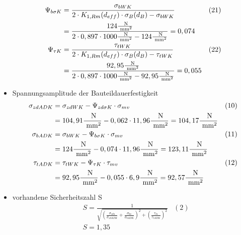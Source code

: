 \begin{itemize}
\begin{align*}
	\Psi_{b \sigma K}&= \frac{\sigma_{bWK}}{2 \cdot  K_{1,Rm} (d_{eff}) \cdot \sigma_B (d_B) -\sigma_{bWK}} &(21) \\
	&=  \frac{124 \frac{\text{ N}}{\text{ mm}^2}}{2 \cdot 0,897 \cdot 1000\frac{\text{ N}}{\text{ mm}^2} - 124 \frac{\text{ N}}{\text{ mm}^2}} = 0,074 \\
	\Psi_{\tau K}&= \frac{\tau_{tWK}}{2 \cdot  K_{1,Rm} (d_{eff}) \cdot \sigma_B (d_B) -\tau_{tWK}} &(22) \\
	&=  \frac{92,95 \frac{\text{ N}}{\text{ mm}^2}}{2 \cdot 0,897 \cdot 1000\frac{\text{ N}}{\text{ mm}^2} - 92,95 \frac{\text{ N}}{\text{ mm}^2}} = 0,055 
	\end{align*}
	\item Spannungsamplitude der Bauteildauerfestigkeit
	\begin{align*}
	\sigma_{zdADK} &= \sigma_{zdWK} - \Psi_{zd \sigma K} \cdot \sigma_{mv} &(10) \\
	&= 104,91\frac{\text{ N}}{\text{ mm}^2} - 0,062 \cdot 11,96 \frac{\text{ N}}{\text{ mm}^2} = 104,17 \frac{\text{ N}}{\text{ mm}^2} \\
	\sigma_{bADK} &= \sigma_{bWK} - \Psi_{b \sigma K} \cdot \sigma_{mv} &(11) \\
	&= 124\frac{\text{ N}}{\text{ mm}^2} - 0,074 \cdot 11,96 \frac{\text{ N}}{\text{ mm}^2} = 123,11\frac{\text{ N}}{\text{ mm}^2} \\
	\tau_{tADK} &= \tau_{tWK} - \Psi_{ \tau K} \cdot \tau_{mv} &(12) \\
	&= 92,95\frac{\text{ N}}{\text{ mm}^2} - 0,055 \cdot6,9 \frac{\text{ N}}{\text{ mm}^2} = 92,57 \frac{\text{ N}}{\text{ mm}^2} 
	\end{align*}
	\item vorhandene Sicherheitszahl S 
	\begin{align*}
	&S= \frac{1}{\sqrt{\left( \frac{\sigma_{zda}}{\sigma_{zdADK}} +\frac{\sigma_{ba}}{\sigma_{bADK}} \right)^2 +\left( \frac{\tau_{ta}}{\tau_{tADK}} \right)^2 }} &(2) \\
	&S=  1,35 
	\end{align*}
\end{itemize}
